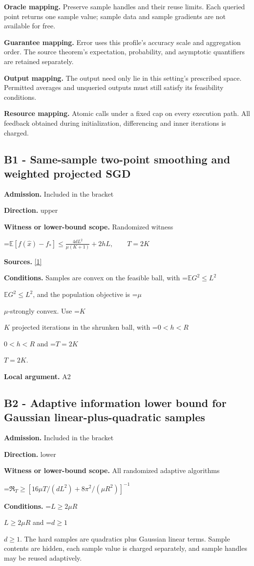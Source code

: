 \documentclass[10pt,a4paper]{article}
\newcommand{\AtlasMath}[1]{\par\begingroup\centering\setbox0=\hbox{$\displaystyle #1$}\ifdim\wd0>1.4\linewidth\typeout{ATLAS WIDE FORMULA: \the\wd0}\fi\ifdim\wd0>\linewidth\resizebox{\linewidth}{!}{\box0}\else\box0\fi\par\endgroup}
\newcommand{\AtlasInlineMath}[1]{\begingroup\setbox0=\hbox{$#1$}\ifdim\wd0>.4\linewidth\endgroup\AtlasMath{#1}\else\endgroup$#1$\fi}
\begin{document}
\textbf{Oracle mapping.} Preserve sample handles and their reuse limits. Each queried point returns one sample value; sample data and sample gradients are not available for free.

\textbf{Guarantee mapping.} Error uses this profile's accuracy scale and aggregation order. The source theorem's expectation, probability, and asymptotic quantifiers are retained separately.

\textbf{Output mapping.} The output need only lie in this setting's prescribed space. Permitted averages and unqueried outputs must still satisfy its feasibility conditions.

\textbf{Resource mapping.} Atomic calls under a fixed cap on every execution path. All feedback obtained during initialization, differencing and inner iterations is charged.

\subsection{B1 - Same-sample two-point smoothing and weighted projected SGD}
\textbf{Admission.} Included in the bracket

\textbf{Direction.} upper

\textbf{Witness or lower-bound scope.} Randomized witness

\AtlasMath{\mathbb{E}[f(\widehat{x})-f_*]\le\frac{4dL^2}{\mu(K+1)}+2hL,\qquad T=2K}
\textbf{Sources.} \href{https://jmlr.org/papers/volume18/16-632/16-632.pdf}{[1]}

\textbf{Conditions.} Samples are convex on the feasible ball, with \AtlasInlineMath{\mathbb{E} G^2\le L^2}, and the population objective is \AtlasInlineMath{\mu}-strongly convex. Use \AtlasInlineMath{K} projected iterations in the shrunken ball, with \AtlasInlineMath{0<h<R} and \AtlasInlineMath{T=2K}.

\textbf{Local argument.} A2

\subsection{B2 - Adaptive information lower bound for Gaussian linear-plus-quadratic samples}
\textbf{Admission.} Included in the bracket

\textbf{Direction.} lower

\textbf{Witness or lower-bound scope.} All randomized adaptive algorithms

\AtlasMath{\mathfrak R_T\ge[16\mu T/(dL^2)+8\pi^2/(\mu R^2)]^{-1}}
\textbf{Conditions.} \AtlasInlineMath{L\ge2\mu R} and \AtlasInlineMath{d\ge1}. The hard samples are quadratics plus Gaussian linear terms. Sample contents are hidden, each sample value is charged separately, and sample handles may be reused adaptively.
\end{document}
